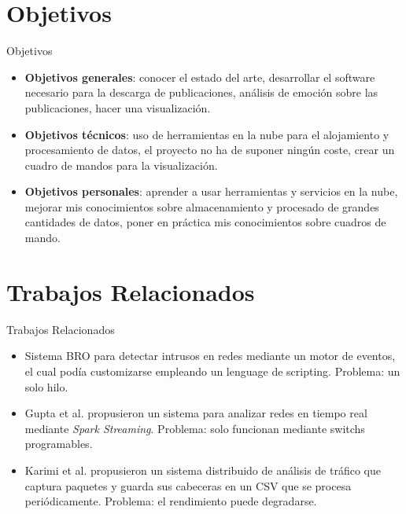\documentclass[aspectratio=149]{beamer}
\begin{document}
\section{Objetivos}
\begin{frame}[label=objetivos]{Objetivos}
    \begin{itemize}
        \item \textbf{Objetivos generales}: conocer el estado del arte, desarrollar el software necesario para la descarga de publicaciones, análisis de emoción sobre las publicaciones, hacer una visualización.
        \item \textbf{Objetivos técnicos}: uso de herramientas en la nube para el alojamiento y procesamiento de datos, el proyecto no ha de suponer ningún coste, crear un cuadro de mandos para la visualización.
        \item \textbf{Objetivos personales}: aprender a usar herramientas y servicios en la nube, mejorar mis conocimientos sobre almacenamiento y procesado de grandes cantidades de datos, poner en práctica mis conocimientos sobre cuadros de mando.
    \end{itemize}
\end{frame}

\section{Trabajos Relacionados}
\begin{frame}[label=relat]{Trabajos Relacionados}
    \begin{itemize}
        \item Sistema BRO para detectar intrusos en redes mediante un motor de eventos, el cual podía customizarse empleando un lenguage de scripting. Problema: un solo hilo.
        \item Gupta et al. propusieron un sistema para analizar redes en tiempo real mediante \textit{Spark Streaming}. Problema: solo funcionan mediante switchs programables.
        \item Karimi et al. propusieron un sistema distribuido de análisis de tráfico que captura paquetes y guarda sus cabeceras en un CSV que se procesa periódicamente. Problema: el rendimiento puede degradarse.
    \end{itemize}
\end{frame}
\end{document}
